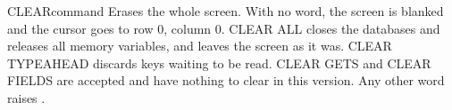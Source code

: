 \begin{XbaseEntry}{CLEAR}{command}
Erases the whole screen.
\Syntax
{}
\Usage
With no word, the screen is blanked and the cursor goes to row 0, column 0.
CLEAR ALL closes the databases and releases all memory variables, and leaves the
screen as it was.  CLEAR TYPEAHEAD discards keys waiting to be read.  CLEAR GETS
and CLEAR FIELDS are accepted and have nothing to clear in this version.  Any
other word raises .
\end{XbaseEntry}

